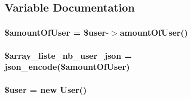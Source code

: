 \subsection{Variable Documentation}
\hypertarget{get_amount_user_8php_aa7f8033e965aeb22726e389f18b50fa9}{
\subsubsection[{\$amount\-Of\-User}]{\setlength{\rightskip}{0pt plus 5cm}\$amount\-Of\-User = \$user-\/$>$amount\-Of\-User()}}\label{get_amount_user_8php_aa7f8033e965aeb22726e389f18b50fa9}
\hypertarget{get_amount_user_8php_a87ab759433982259e3f1beb8d1143dae}{
\subsubsection[{\$array\-\_\-liste\-\_\-nb\-\_\-user\-\_\-json}]{\setlength{\rightskip}{0pt plus 5cm}\$array\-\_\-liste\-\_\-nb\-\_\-user\-\_\-json = json\-\_\-encode(\$amount\-Of\-User)}}\label{get_amount_user_8php_a87ab759433982259e3f1beb8d1143dae}
\hypertarget{get_amount_user_8php_a598ca4e71b15a1313ec95f0df1027ca5}{
\subsubsection[{\$user}]{\setlength{\rightskip}{0pt plus 5cm}\$user = new {\bf User}()}}\label{get_amount_user_8php_a598ca4e71b15a1313ec95f0df1027ca5}
